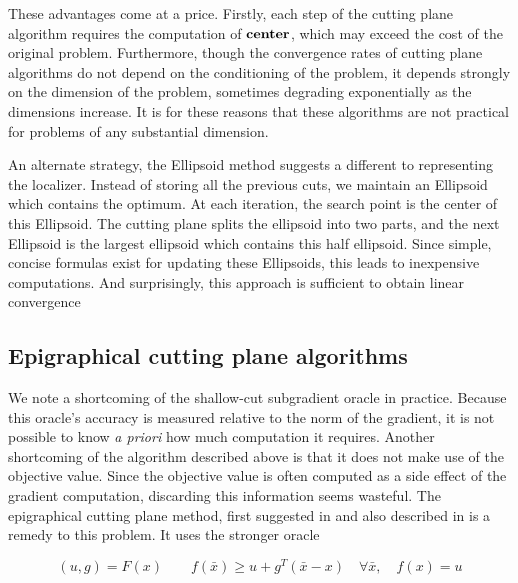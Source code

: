 These advantages come at a price. Firstly, each step of the cutting
plane algorithm requires the computation of ${\bf center}$, which may
exceed the cost of the original problem. Furthermore, though the
convergence rates of cutting plane algorithms do not depend on the
conditioning of the problem, it depends strongly on the dimension of
the problem, sometimes degrading exponentially as the dimensions
increase. It is for these reasons that these algorithms are not
practical for problems of any substantial dimension.

An alternate strategy, the Ellipsoid method \cite{bland1981ellipsoid} suggests
a different to representing the localizer. Instead of storing all the previous
cuts, we maintain an  Ellipsoid which contains the optimum. At each iteration,
the search point is the center of this Ellipsoid. The cutting plane splits the
ellipsoid into two parts, and the next Ellipsoid is the largest ellipsoid
which contains this half ellipsoid.  Since simple, concise formulas exist for
updating these Ellipsoids,  this leads to inexpensive computations. And
surprisingly, this approach is sufficient to obtain linear convergence


\subsection{Epigraphical cutting plane algorithms}

We note a shortcoming of the shallow-cut subgradient oracle in
practice. Because this oracle's accuracy is measured relative to the
norm of the gradient, it is not possible to know \emph{a priori} how
much computation it requires. Another shortcoming of the algorithm
described above is that it does not make use of the objective value.
Since the objective value is often computed as a side effect of the
gradient computation, discarding this information seems wasteful. The
epigraphical cutting plane method, first suggested in
\cite{bahn1994experimental} and also described in
\cite{boyd2007localization,goffin1999two,mehrotra2000volumetric} is a
remedy to this problem. It uses the stronger oracle

\begin{defn}
\begin{equation} \label{eq:0-1-Oracle}
(u,g) = F(x) \qquad f(\bar{x}) \geq u+g^T(\bar{x}-x)\quad \forall \bar{x}, \quad f(x) = u
\end{equation}
\end{defn}

